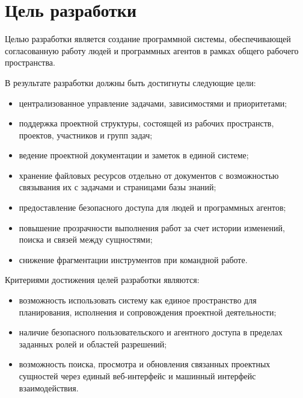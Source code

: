 \section{Цель разработки}

\headingtextsep

Целью разработки является создание программной системы, обеспечивающей согласованную работу людей и программных агентов в рамках общего рабочего пространства.

В результате разработки должны быть достигнуты следующие цели:

\begin{itemize}
    \item централизованное управление задачами, зависимостями и приоритетами;
    \item поддержка проектной структуры, состоящей из рабочих пространств, проектов, участников и групп задач;
    \item ведение проектной документации и заметок в единой системе;
    \item хранение файловых ресурсов отдельно от документов с возможностью связывания их с задачами и страницами базы знаний;
    \item предоставление безопасного доступа для людей и программных агентов;
    \item повышение прозрачности выполнения работ за счет истории изменений, поиска и связей между сущностями;
    \item снижение фрагментации инструментов при командной работе.
\end{itemize}

Критериями достижения целей разработки являются:

\begin{itemize}
    \item возможность использовать систему как единое пространство для планирования, исполнения и сопровождения проектной деятельности;
    \item наличие безопасного пользовательского и агентного доступа в пределах заданных ролей и областей разрешений;
    \item возможность поиска, просмотра и обновления связанных проектных сущностей через единый веб-интерфейс и машинный интерфейс взаимодействия.
\end{itemize}